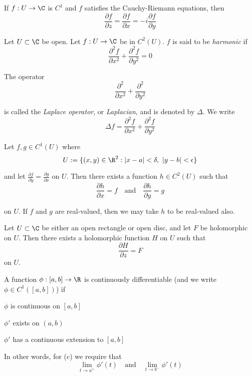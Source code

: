 \label{d507f47}

If $f:U\to\C$ is $C^1$ and $f$ satisfies the Cauchy-Riemann equations, then
$$
  \frac{\partial f}{\partial z}=\frac{\partial f}{\partial x}=
  -i\frac{\partial f}{\partial y}
$$

\label{d53f60f}

Let $U\subset\C$ be open. Let $f:U\to\C$ be in $C^2(U)$. $f$ is said to be
\textit{harmonic} if
$$
  \frac{\partial^2f}{\partial x^2}+\frac{\partial^2f}{\partial y^2}=0
$$

The operator
$$
  \frac{\partial^2}{\partial x^2}+\frac{\partial^2}{\partial y^2}
$$

is called the \textit{Laplace operator}, or \textit{Laplacian}, and is denoted
by $\Delta$. We write
$$
  \Delta f=\frac{\partial^2f}{\partial x^2}+\frac{\partial^2f}{\partial y^2}
$$

\label{fdd4521}

Let $f,g\in C^1(U)$ where
$$
  U:=\{ (x,y)\in\R^2:|x-a|<\delta,\ |y-b|<\epsilon \}
$$

and let $\displaystyle\frac{\partial f}{\partial y}=\frac{\partial g}{\partial
  x}$ on $U$. Then there exists a function $h\in C^2(U)$ such that
$$
  \frac{\partial h}{\partial x}=f
  \quad\text{and}\quad
  \frac{\partial h}{\partial y}=g
$$

on $U$. If $f$ and $g$ are real-valued, then we may take $h$ to be real-valued
also.

\label{e7808d1}

Let $U\subset\C$ be either an open rectangle or open disc, and let $F$ be
holomorphic on $U$. Then there exists a holomorphic function $H$ on $U$ such
that
$$
  \frac{\partial H}{\partial z}=F
$$
on $U$.

\label{c1f6d35}

A function $\phi:[a,b]\to\R$ is continuously differentiable (and we write
$\phi\in C^1([a,b])$) if

\begin{enumerata}
  \item $\phi$ is continuous on $[a,b]$
  \item $\phi'$ exists on $(a,b)$
  \item $\phi'$ has a continuous extension to $[a,b]$
\end{enumerata}

In other words, for (c) we require that
$$
  \lim_{t\to a^+}\phi'(t)\quad\text{and}\quad\lim_{t\to b^-}\phi'(t)
$$

